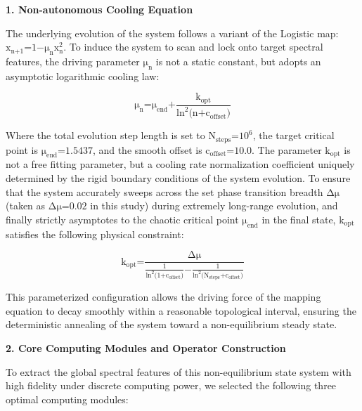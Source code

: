 \textbf{1. Non-autonomous Cooling Equation}

The underlying evolution of the system follows a variant of the Logistic
map:
\(\text{x}_{\text{n}\text{+1}}\text{=1−}\text{μ}_{\text{n}}\text{x}_{\text{n}}^{\text{2}}\).
To induce the system to scan and lock onto target spectral features, the
driving parameter \(\text{μ}_{\text{n}}\) is not a static constant, but
adopts an asymptotic logarithmic cooling law:

\[\text{μ}_{\text{n}}\text{=}\text{μ}_{\text{end}}\text{+}\frac{\text{k}_{\text{opt}}}{\text{ln}^{\text{2}}\text{(}\text{n}\text{+}\text{c}_{\text{offset}}\text{)}}\]

Where the total evolution step length is set to
\(\text{N}_{\text{steps}}\text{=}\text{10}^{\text{6}}\), the target
critical point is \(\text{μ}_{\text{end}}\text{=1.5437}\), and the
smooth offset is \(\text{c}_{\text{offset}}\text{=10.0}\). The parameter
\(\text{k}_{\text{opt}}\) is not a free fitting parameter, but a cooling
rate normalization coefficient uniquely determined by the rigid boundary
conditions of the system evolution. To ensure that the system accurately
sweeps across the set phase transition breadth \(\text{Δ}\text{μ}\)
(taken as \(\text{Δ}\text{μ}\text{=0.02}\) in this study) during
extremely long-range evolution, and finally strictly asymptotes to the
chaotic critical point \(\text{μ}_{\text{end}}\) in the final state,
\(\text{k}_{\text{opt}}\) satisfies the following physical constraint:

\[\text{k}_{\text{opt}}\text{=}\frac{\text{Δ}\text{μ}}{\frac{\text{1}}{\text{ln}^{\text{2}}\text{(1+}\text{c}_{\text{offset}}\text{)}}\text{−}\frac{\text{1}}{\text{ln}^{\text{2}}\text{(}\text{N}_{\text{steps}}\text{+}\text{c}_{\text{offset}}\text{)}}}\]

This parameterized configuration allows the driving force of the mapping
equation to decay smoothly within a reasonable topological interval,
ensuring the deterministic annealing of the system toward a
non-equilibrium steady state.

\textbf{2. Core Computing Modules and Operator Construction}

To extract the global spectral features of this non-equilibrium state
system with high fidelity under discrete computing power, we selected
the following three optimal computing modules:

